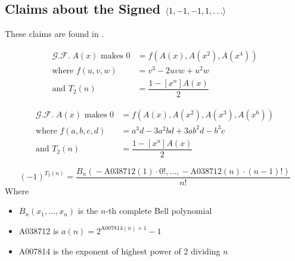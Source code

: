 \documentclass[conference]{IEEEtran}
\begin{document}
\subsection{Claims about the Signed \TMS $\tuple{1, -1, -1, 1, \dots}$}

These claims are found in \cite{OEIS-TMS-pos-neg}.

\begin{conjecture}
    \begin{equation}
    \begin{aligned}
        \mathcal{G.F.}\; A(x) \text{ makes } 0 &= f(A(x), A(x^2), A(x^4)) \\
        \text{where } f(u, v, w) &= v^3 - 2uvw + u^2w\\
        \text{and } T_2(n) &= \dfrac{1 - [x^n]A(x)}{2}
    \end{aligned}
    \end{equation}
\end{conjecture}

\begin{conjecture}
    \begin{equation}
    \begin{aligned}
        \mathcal{G.F.}\; A(x) \text{ makes } 0 &= f(A(x), A(x^2), A(x^3), A(x^6))\\
        \text{where } f(a, b, c, d) &= a^3d - 3a^2bd + 3ab^2d - b^3c\\
        \text{and } T_2(n) &= \dfrac{1 - [x^n]A(x)}{2}
    \end{aligned}
    \end{equation}
\end{conjecture}

\begin{conjecture}
    \begin{equation}
        (-1)^{T_2(n)} = \dfrac{B_n(\!-\!\text{A038712}(1) \!\cdot\! 0!, \dots, \!-\!\text{A038712}(n) \!\cdot\! (n\!\!-\!\!1)!)}{n!}
    \end{equation}
    Where \begin{itemize}
        \item $B_n(x_1, \dots, x_n)$ is the $n$-th complete Bell polynomial
        \item A038712 \cite{OEIS-A038712} is $a(n) = 2^{\text{A007814}(n)+1}-1$
        \item A007814 \cite{OEIS-A007814} is the exponent of highest power of 2 dividing $n$
    \end{itemize}
\end{conjecture}
\end{document}

